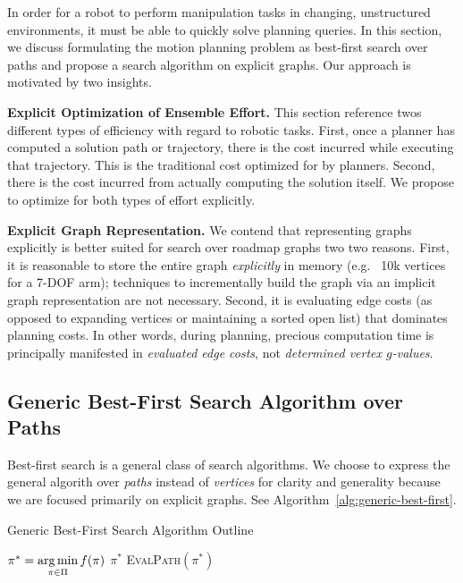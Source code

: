 In order for a robot to perform manipulation tasks
in changing, unstructured environments,
it must be able to quickly solve planning queries.
In this section,
we discuss formulating
the motion planning problem as best-first search over paths
and propose a search algorithm on explicit graphs.
Our approach is motivated by two insights.

\textbf{Explicit Optimization of Ensemble Effort.}
This section reference twos different types of efficiency
with regard to robotic tasks.
First, once a planner has computed a solution path or trajectory,
there is the cost incurred while executing that trajectory.
This is the traditional cost optimized for by planners.
Second, there is the cost incurred from actually computing the solution
itself.
We propose to optimize for both types of effort explicitly.

\textbf{Explicit Graph Representation.}
We contend that representing graphs explicitly
is better suited for search over roadmap graphs
two two reasons.
First, it is reasonable to store the entire graph
\emph{explicitly} in memory
(e.g. ~10k vertices for a 7-DOF arm);
techniques to incrementally build the graph
via an implicit graph representation
are not necessary.
Second,
it is evaluating edge costs
(as opposed to expanding vertices or maintaining
a sorted open list)
that dominates planning costs.
In other words, during planning,
precious computation time is principally manifested in
\emph{evaluated edge costs},
not \emph{determined vertex $g$-values}.

\subsection{Generic Best-First Search Algorithm over Paths}

Best-first search \cite{winston1977ai}
is a general class of search algorithms.
We choose to express the general algorith
over \emph{paths} instead of \emph{vertices}
for clarity and generality
because we are focused primarily on explicit graphs.
See Algorithm~\ref{alg:generic-best-first}.

\begin{algorithm}
   \caption{Generic Best-First Search Algorithm Outline}
   \label{alg:generic-best-first}
   \begin{algorithmic}[1]
   \Loop
      \State $\pi^* = \operatorname*{arg\,min}\limits_{\pi \in \Pi} f(\pi)$
         \label{line:generic-select-optimistic-path}
         \State \Return $\pi^*$
      \EndIf
      \State \textsc{EvalPath}$(\pi^*)$
   \EndLoop
   \EndProcedure
   \end{algorithmic}
\end{algorithm}

